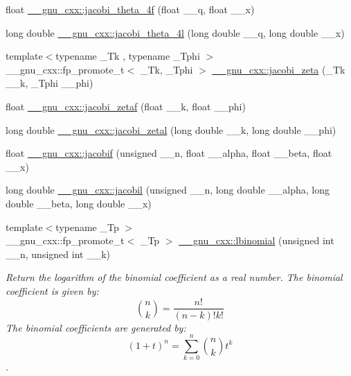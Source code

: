 \begin{DoxyCompactItemize}
\item 
float \hyperlink{group__gnu__math__spec__func_ga57dcc5ae4b1a3d1e38adccad85204bca}{\+\_\+\+\_\+gnu\+\_\+cxx\+::jacobi\+\_\+theta\+\_\+4f} (float \+\_\+\+\_\+q, float \+\_\+\+\_\+x)
\item 
long double \hyperlink{group__gnu__math__spec__func_ga7c2a13198bdfd3f8cf1bc1758b1f56be}{\+\_\+\+\_\+gnu\+\_\+cxx\+::jacobi\+\_\+theta\+\_\+4l} (long double \+\_\+\+\_\+q, long double \+\_\+\+\_\+x)
\item 
{\footnotesize template$<$typename \+\_\+\+Tk , typename \+\_\+\+Tphi $>$ }\\\+\_\+\+\_\+gnu\+\_\+cxx\+::fp\+\_\+promote\+\_\+t$<$ \+\_\+\+Tk, \+\_\+\+Tphi $>$ \hyperlink{group__gnu__math__spec__func_ga639be4ebef9a20572375ec534be52b07}{\+\_\+\+\_\+gnu\+\_\+cxx\+::jacobi\+\_\+zeta} (\+\_\+\+Tk \+\_\+\+\_\+k, \+\_\+\+Tphi \+\_\+\+\_\+phi)
\item 
float \hyperlink{group__gnu__math__spec__func_gaedb6b352331c67b9dea73660e2045668}{\+\_\+\+\_\+gnu\+\_\+cxx\+::jacobi\+\_\+zetaf} (float \+\_\+\+\_\+k, float \+\_\+\+\_\+phi)
\item 
long double \hyperlink{group__gnu__math__spec__func_ga9db158df9459aa12c840724338753913}{\+\_\+\+\_\+gnu\+\_\+cxx\+::jacobi\+\_\+zetal} (long double \+\_\+\+\_\+k, long double \+\_\+\+\_\+phi)
\item 
float \hyperlink{group__gnu__math__spec__func_ga450db12e06d6993d169afab5b3f6d0b8}{\+\_\+\+\_\+gnu\+\_\+cxx\+::jacobif} (unsigned \+\_\+\+\_\+n, float \+\_\+\+\_\+alpha, float \+\_\+\+\_\+beta, float \+\_\+\+\_\+x)
\item 
long double \hyperlink{group__gnu__math__spec__func_ga2898a5ebf451eaf259ecfcdd171aa72b}{\+\_\+\+\_\+gnu\+\_\+cxx\+::jacobil} (unsigned \+\_\+\+\_\+n, long double \+\_\+\+\_\+alpha, long double \+\_\+\+\_\+beta, long double \+\_\+\+\_\+x)
\item 
{\footnotesize template$<$typename \+\_\+\+Tp $>$ }\\\+\_\+\+\_\+gnu\+\_\+cxx\+::fp\+\_\+promote\+\_\+t$<$ \+\_\+\+Tp $>$ \hyperlink{group__gnu__math__spec__func_gabfa5aeba56edfa110846fc8e76963bc2}{\+\_\+\+\_\+gnu\+\_\+cxx\+::lbinomial} (unsigned int \+\_\+\+\_\+n, unsigned int \+\_\+\+\_\+k)
\begin{DoxyCompactList}\small\item\em Return the logarithm of the binomial coefficient as a real number. The binomial coefficient is given by\+: \[ \binom{n}{k} = \frac{n!}{(n-k)! k!} \] The binomial coefficients are generated by\+: \[ \left(1 + t\right)^n = \sum_{k=0}^n \binom{n}{k} t^k \]. \end{DoxyCompactList}\item 

\end{DoxyCompactItemize}
